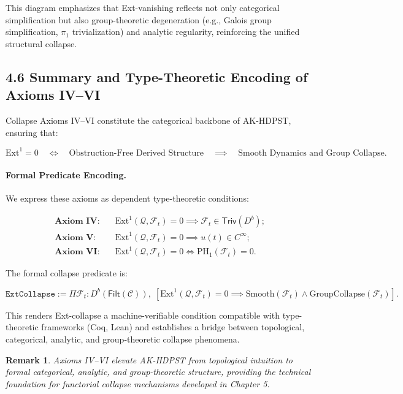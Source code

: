 \documentclass[11pt]{article}
\newtheorem{remark}[theorem]{Remark}
\begin{document}
This diagram emphasizes that Ext-vanishing reflects not only categorical simplification but also group-theoretic degeneration (e.g., Galois group simplification, $\pi_1$ trivialization) and analytic regularity, reinforcing the unified structural collapse.

\subsection*{4.6 Summary and Type-Theoretic Encoding of Axioms IV–VI}

Collapse Axioms IV–VI constitute the categorical backbone of AK-HDPST, ensuring that:

\[
\mathrm{Ext}^1 = 0 \quad \Longleftrightarrow \quad \text{Obstruction-Free Derived Structure} \quad \implies \quad \text{Smooth Dynamics and Group Collapse}.
\]

\paragraph{Formal Predicate Encoding.}

We express these axioms as dependent type-theoretic conditions:

\begin{align*}
\textbf{Axiom IV:} &\quad \mathrm{Ext}^1(\mathcal{Q}, \mathcal{F}_t) = 0 \implies \mathcal{F}_t \in \mathsf{Triv}(D^b); \\
\textbf{Axiom V:} &\quad \mathrm{Ext}^1(\mathcal{Q}, \mathcal{F}_t) = 0 \implies u(t) \in C^\infty; \\
\textbf{Axiom VI:} &\quad \mathrm{Ext}^1(\mathcal{Q}, \mathcal{F}_t) = 0 \iff \mathrm{PH}_1(\mathcal{F}_t) = 0.
\end{align*}

The formal collapse predicate is:

\[
\texttt{ExtCollapse} := \Pi \mathcal{F}_t : D^b(\mathsf{Filt}(\mathcal{C})),\; \left[
\mathrm{Ext}^1(\mathcal{Q}, \mathcal{F}_t) = 0 \implies \mathrm{Smooth}(\mathcal{F}_t) \wedge \mathrm{GroupCollapse}(\mathcal{F}_t)
\right].
\]

This renders Ext-collapse a machine-verifiable condition compatible with type-theoretic frameworks (Coq, Lean) and establishes a bridge between topological, categorical, analytic, and group-theoretic collapse phenomena.

\begin{remark}
Axioms IV–VI elevate AK-HDPST from topological intuition to formal categorical, analytic, and group-theoretic structure, providing the technical foundation for functorial collapse mechanisms developed in Chapter 5.
\end{remark}
\end{document}
